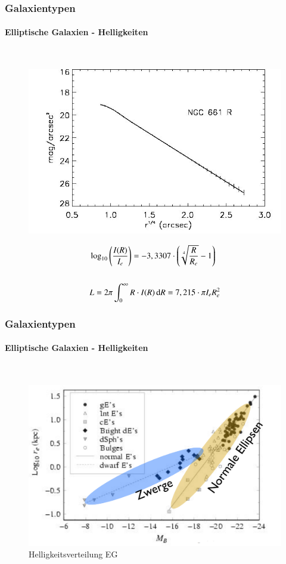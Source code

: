\begin{frame}
\frametitle{Galaxientypen}
\framesubtitle{Elliptische Galaxien - Helligkeiten}

\hfill \\

\begin{figure}
\includegraphics[scale=0.25]{Helligkeitsprofil_Ellipse.jpg}
\end{figure}


\begin{align*}
&\log_{10} \left( \frac{I(R)}{I_e} \right) = - 3,3307 \cdot \left( \sqrt[4]{\frac{R}{R_e}}  - 1 \right) \\
\hfill \\
&L = 2\pi \int_0^\infty R \cdot I(R) \d R = 7,215 \cdot \pi I_e R_e^2
\end{align*}

\end{frame}


\begin{frame}
\frametitle{Galaxientypen}
\framesubtitle{Elliptische Galaxien - Helligkeiten}

\hfill \\

\begin{figure}
\includegraphics[scale=0.25]{Helligkeitesverteilung_Ellipsen.png}
\caption{Helligkeitsverteilung EG}
\end{figure}



\end{frame}




